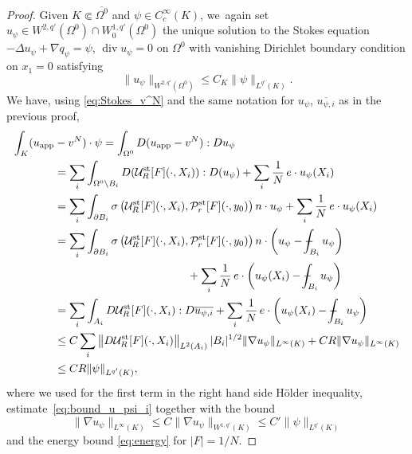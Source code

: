 \documentclass[10pt]{amsart}
\newcommand{\app}{\mathrm{app}}
\newcommand{\st}{\mathrm{st}}
\def\Xint#1{\mathchoice
{\XXint\displaystyle\textstyle{#1}}%
{\XXint\textstyle\scriptstyle{#1}}%
{\XXint\scriptstyle\scriptscriptstyle{#1}}%
{\XXint\scriptscriptstyle\scriptscriptstyle{#1}}%
\!\int}
\def\XXint#1#2#3{{\setbox0=\hbox{$#1{#2#3}{\int}$ }
\vcenter{\hbox{$#2#3$ }}\kern-.6\wd0}}
\def\dashint{\Xint-}
\renewcommand{\div}{\operatorname{div}}
\theoremstyle{plain}
\theoremstyle{definition}
\begin{document}
\begin{proof}
Given $K \Subset \overline{\Omega^0}$ and $\psi \in C^\infty_c(K)$, we~again set $u_\psi \in W^{2,q'}(\Omega^0) \cap W^{1,q'}_0(\Omega^0)$ the unique solution to the Stokes equation $-\Delta u_\psi+\nabla q_\psi=\psi $, $\div u_\psi=0$ on $\Omega^0$ with vanishing Dirichlet boundary condition on $x_1=0$ satisfying
\begin{equation}\label{eq:estimation_dualite}
\|u_\psi \|_{W^{2,q'}(\Omega^0)} \leq C_K \|\psi\|_{L^{q'}(K)}.
\end{equation}
We have, using \eqref{eq:Stokes_v^N} and the same notation for $u_\psi$, $\overline{u_{\psi,i}}$ as in the previous proof,\vspace*{-3pt}
\begin{align*}
\int_K(u_{\app}&-v^N)\cdot \psi =\int_{\Omega^0} D(u_{\app}-v^N): Du_{\psi}\\
&=\sum_i \int_{\Omega^0\setminus B_i } D(\mathcal{U}^{\st}_R[F](\cdot,X_i)) : D(u_{\psi}) + \sum_i\frac{1}{N}\,e \cdot u_\psi(X_i)\\
&= \sum_i \int_{\partial B_i}\sigma \left(\mathcal{U}^{\st}_R[F](\cdot,X_i),\mathcal{P}^{\st}_{r}[F](\cdot,y_0)\right) n \cdot u_{\psi} +\sum_i \frac{1}{N}\,e \cdot u_\psi(X_i)\\
&= \sum_i \int_{\partial B_i}\sigma \left(\mathcal{U}^{\st}_R[F](\cdot,X_i), \mathcal{P}^{\st}_{r}[F](\cdot,y_0)\right) n \cdot \left(u_{\psi}- \dashint_{B_i} u_\psi\right) \\
&\hspace*{4.2cm}+ \sum_i\frac{1}{N}\, e \cdot \left(u_\psi(X_i)-\dashint_{B_i} u_\psi \right)\\
&=\sum_i \int_{A_i} D \mathcal{U}^{\st}_R[F](\cdot,X_i): D\overline{u_{\psi,i}} + \sum_i\frac{1}{N}\, e \cdot \left(u_\psi(X_i)-\dashint_{B_i} u_\psi \right)\\
& \leq C \sum_i \left \| D \mathcal{U}^{\st}_R[F](\cdot,X_i) \right\|_{L^2(A_i)} |B_i|^{1/2} \|\nabla u_\psi\|_{L^\infty(K)}+ CR \|\nabla u_\psi\|_{L^\infty(K)}\\
& \leq CR \|\psi\|_{L^{q'}(K)},
\end{align*}
where we used for the first term in the right hand side Hölder inequality, estimate~\eqref{eq:bound_u_psi_i} together with the bound\vspace*{-3pt}
\[
\|\nabla u_\psi\|_{L^\infty(K)} \le C \|\nabla u_\psi\|_{W^{1,q'}(K)} \le C' \|\psi\|_{L^{q'}(K)}
\]
and the energy bound \eqref{eq:energy} for $|F|=1/N$.
\end{proof}
\end{document}
